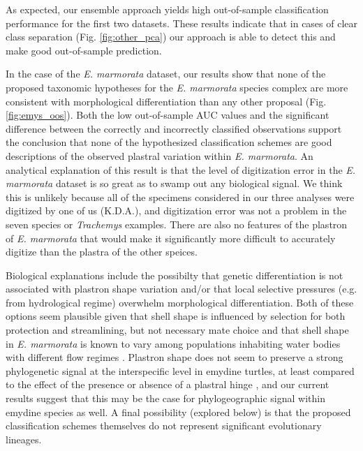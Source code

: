 \documentclass[12pt,letterpaper]{article}
\begin{document}
As expected, our ensemble approach yields high out-of-sample classification performance for the first two datasets. These results indicate that in cases of clear class separation (Fig. \ref{fig:other_pca}) our approach is able to detect this and make good out-of-sample prediction.

In the case of the \textit{E. marmorata} dataset, our results show that none of the proposed taxonomic hypotheses for the \textit{E. marmorata} species complex are more consistent with morphological differentiation than any other proposal (Fig. \ref{fig:emys_oos}). Both the low out-of-sample AUC values and the significant difference between the correctly and incorrectly classified observations support the conclusion that none of the hypothesized classification schemes are good descriptions of the observed plastral variation within \textit{E. marmorata}. An analytical explanation of this result is that the level of digitization error in the \textit{E. marmorata} dataset is so great as to swamp out any biological signal. We think this is unlikely because all of the specimens considered in our three analyses were digitized by one of us (K.D.A.), and digitization error was not a problem in the seven species or \textit{Trachemys} examples. There are also no features of the plastron of \textit{E. marmorata} that would make it significantly more difficult to accurately digitize than the plastra of the other speices.

Biological explanations include the possibilty that genetic differentiation is not associated with plastron shape variation and/or that local selective pressures (e.g. from hydrological regime) overwhelm morphological differentiation. Both of these options seem plausible given that shell shape is influenced by selection for both protection and streamlining, but not necessary mate choice \citep{Rivera2008,Rivera2011,Stayton2011,Rivera2014,Polly2016} and that shell shape in \textit{E. marmorata} is known to vary among populations inhabiting water bodies with different flow regimes \citep{Holland1992,Lubcke2007,Germano2009}. Plastron shape does not seem to preserve a strong phylogenetic signal at the interspecific level in emydine turtles, at least compared to the effect of the presence or absence of a plastral hinge \citep{Angielczyk2011}, and our current results suggest that this may be the case for phylogeographic signal within emydine species as well. A final possibility (explored below) is that the proposed classification schemes themselves do not represent significant evolutionary lineages.
\end{document}
